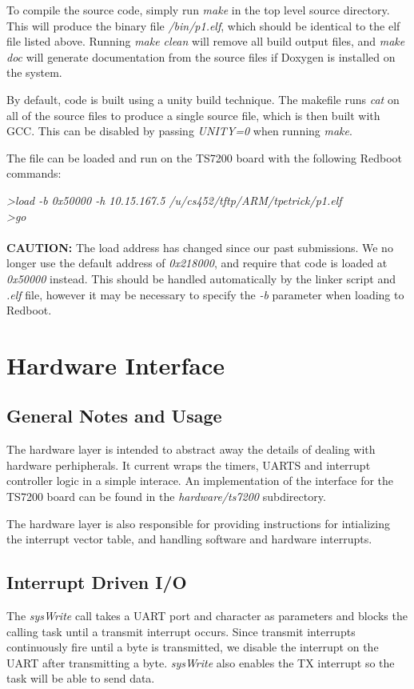 \documentclass[twoside,a4paper]{refart}
\begin{document}
To compile the source code, simply run \textit{make} in the top level source directory. This will produce the binary file \textit{/bin/p1.elf}, which should be identical to the elf file listed above. Running \textit{make clean} will remove all build output files, and \textit{make doc} will generate documentation from the source files if Doxygen is installed on the system.

By default, code is built using a unity build technique. The makefile runs \textit{cat} on all of the source files to produce a single source file, which is then built with GCC. This can be disabled by passing \textit{UNITY=0} when running \textit{make}.

The file can be loaded and run on the TS7200 board with the following Redboot commands:

\textit{\textgreater load -b 0x50000 -h 10.15.167.5 /u/cs452/tftp/ARM/tpetrick/p1.elf}\\
\textit{\textgreater go}\\\\

\textbf{CAUTION:}  The load address has changed since our past submissions. We no longer use the default address of \textit{0x218000}, and require that code is loaded at \textit{0x50000} instead. This should be handled automatically by the linker script and \textit{.elf} file, however it may be necessary to specify the \textit{-b} parameter when loading to Redboot.

\section{Hardware Interface}
\subsection{General Notes and Usage}
The hardware layer is intended to abstract away the details of dealing with hardware perhipherals. It current wraps the timers, UARTS and interrupt controller logic in a simple interace. An implementation of the interface for the TS7200 board can be found in the \textit{hardware/ts7200} subdirectory.

The hardware layer is also responsible for providing instructions for intializing the interrupt vector table, and handling software and hardware interrupts.

\subsection{Interrupt Driven I/O}
The \textit{sysWrite} call takes a UART port and character as parameters and blocks the calling task until a transmit interrupt occurs. Since transmit interrupts continuously fire until a byte is transmitted, we disable the interrupt on the UART after transmitting a byte. \textit{sysWrite} also enables the TX interrupt so the task will be able to send data.
\end{document}
